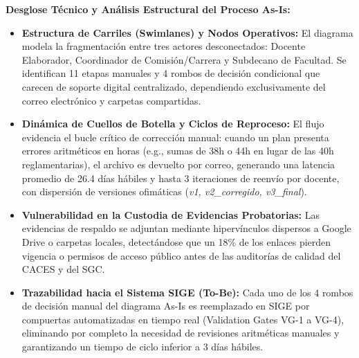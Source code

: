 \documentclass[12pt,a4paper]{article}
\begin{document}
\noindent
\noindent
\textbf{Desglose Técnico y Análisis Estructural del Proceso As-Is:}
\begin{itemize}[leftmargin=1.5em, itemsep=3pt]
    \item \textbf{Estructura de Carriles (Swimlanes) y Nodos Operativos:} El diagrama modela la fragmentación entre tres actores desconectados: Docente Elaborador, Coordinador de Comisión/Carrera y Subdecano de Facultad. Se identifican 11 etapas manuales y 4 rombos de decisión condicional que carecen de soporte digital centralizado, dependiendo exclusivamente del correo electrónico y carpetas compartidas.
    \item \textbf{Dinámica de Cuellos de Botella y Ciclos de Reproceso:} El flujo evidencia el bucle crítico de corrección manual: cuando un plan presenta errores aritméticos en horas (e.g., sumas de 38h o 44h en lugar de las 40h reglamentarias), el archivo es devuelto por correo, generando una latencia promedio de 26.4 días hábiles y hasta 3 iteraciones de reenvío por docente, con dispersión de versiones ofimáticas (\textit{v1, v2\_corregido, v3\_final}).
    \item \textbf{Vulnerabilidad en la Custodia de Evidencias Probatorias:} Las evidencias de respaldo se adjuntan mediante hipervínculos dispersos a Google Drive o carpetas locales, detectándose que un 18\% de los enlaces pierden vigencia o permisos de acceso público antes de las auditorías de calidad del CACES y del SGC.
    \item \textbf{Trazabilidad hacia el Sistema SIGE (To-Be):} Cada uno de los 4 rombos de decisión manual del diagrama As-Is es reemplazado en SIGE por compuertas automatizadas en tiempo real (Validation Gates VG-1 a VG-4), eliminando por completo la necesidad de revisiones aritméticas manuales y garantizando un tiempo de ciclo inferior a 3 días hábiles.
\end{itemize}
\end{document}

